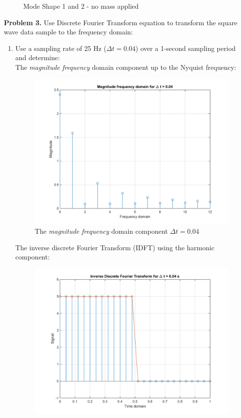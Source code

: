 \documentclass[14pt,a4paper]{article}
\begin{document}
\begin{enumerate}
\begin{figure}[htp]
		\caption{Mode Shape 1 and 2 - no mass applied}
	\end{figure}
	\end{enumerate}
\pagebreak
\textbf{Problem 3.} Use Discrete Fourier Transform equation to transform the square wave data sample to the frequency domain:
\begin{enumerate}
	\item Use a sampling rate of 25 Hz ($\Delta t = 0.04$) over a 1-second sampling period and determine:\\
	The \textit{magnitude frequency} domain component up to the Nyquist frequency:
	\begin{figure}[htp]
		\centering
		\includegraphics[scale=0.58]{fn3_VB1_1.png}
		\caption{The \textit{magnitude frequency} domain component  $\Delta t = 0.04$}
	\end{figure}
	The inverse discrete Fourier Transform (IDFT) using the harmonic component:
	\begin{figure}[htp]
		\centering
		\includegraphics[scale=0.58]{fn3_VB1_2.png}

\end{figure}
\end{enumerate}
\end{document}
